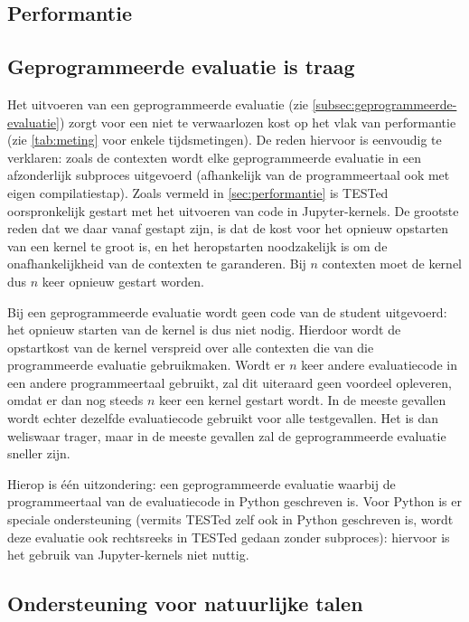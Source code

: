 \subsection{Performantie}\label{subsec:future-performance}

\subsection{Geprogrammeerde evaluatie is traag}\label{subsec:geprogrammeerde-evaluatie-is-traag}

Het uitvoeren van een geprogrammeerde evaluatie (zie \cref{subsec:geprogrammeerde-evaluatie}) zorgt voor een niet te verwaarlozen kost op het vlak van performantie (zie \cref{tab:meting} voor enkele tijdsmetingen).
De reden hiervoor is eenvoudig te verklaren: zoals de contexten wordt elke geprogrammeerde evaluatie in een afzonderlijk subproces uitgevoerd (afhankelijk van de programmeertaal ook met eigen compilatiestap).
Zoals vermeld in \cref{sec:performantie} is TESTed oorspronkelijk gestart met het uitvoeren van code in Jupyter-kernels.
De grootste reden dat we daar vanaf gestapt zijn, is dat de kost voor het opnieuw opstarten van een kernel te groot is, en het heropstarten noodzakelijk is om de onafhankelijkheid van de contexten te garanderen.
Bij $n$ contexten moet de kernel dus $n$ keer opnieuw gestart worden.

Bij een geprogrammeerde evaluatie wordt geen code van de student uitgevoerd: het opnieuw starten van de kernel is dus niet nodig.
Hierdoor wordt de opstartkost van de kernel verspreid over alle contexten die van die programmeerde evaluatie gebruikmaken.
Wordt er $n$ keer andere evaluatiecode in een andere programmeertaal gebruikt, zal dit uiteraard geen voordeel opleveren, omdat er dan nog steeds $n$ keer een kernel gestart wordt.
In de meeste gevallen wordt echter dezelfde evaluatiecode gebruikt voor alle testgevallen.
Het  is dan weliswaar trager, maar in de meeste gevallen zal de geprogrammeerde evaluatie sneller zijn.

Hierop is één uitzondering: een geprogrammeerde evaluatie waarbij de programmeertaal van de evaluatiecode in Python geschreven is.
Voor Python is er speciale ondersteuning (vermits TESTed zelf ook in Python geschreven is, wordt deze evaluatie ook rechtsreeks in TESTed gedaan zonder subproces): hiervoor is het gebruik van Jupyter-kernels niet nuttig.

\subsection{Ondersteuning voor natuurlijke talen}\label{subsec:ondersteuning-voor-natuurlijke-talen}

